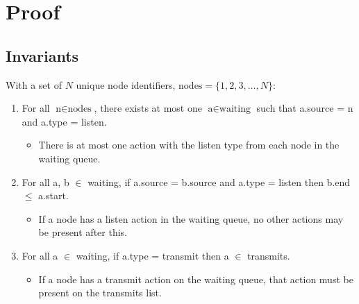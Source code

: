 \clearpage

\section{Proof}

\subsection{Invariants}\label{sec:coordinator-invariants}

With a set of $N$ unique node identifiers, $\text{nodes} = \{ 1, 2, 3, \ldots, N \}$:

\begin{enumerate}
    \item For all $\text{n} \in \text{nodes}$, there exists at most one $\text{a} \in \text{waiting}$ such that a.source = n and a.type = listen.

          \begin{itemize}
              \item There is at most one action with the listen type from each node in the waiting queue.
          \end{itemize}
    \item For all a, b $\in$ waiting, if a.source = b.source and a.type = listen then b.end $\leq$ a.start.
          \begin{itemize}
              \item If a node has a listen action in the waiting queue, no other actions may be present after this.
          \end{itemize}
    \item For all a $\in$ waiting, if a.type = transmit then a $\in$ transmits.

          \begin{itemize}
              \item If a node has a transmit action on the waiting queue, that action must be present on the transmits list.
          \end{itemize}

\end{enumerate}

